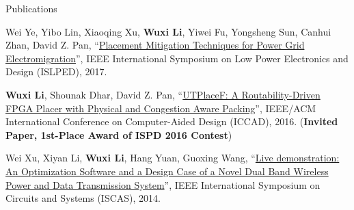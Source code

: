 \begin{rSection}{Publications}
\begin{description}[font=\normalfont]
\item[{[C3]}]{
    Wei Ye, Yibo Lin, Xiaoqing Xu, \textbf{Wuxi Li}, Yiwei Fu, Yongsheng Sun, Canhui Zhan, David Z. Pan,
    ``\href{http://ieeexplore.ieee.org/document/8009178/}{Placement Mitigation Techniques for Power Grid Electromigration}'',
    IEEE International Symposium on Low Power Electronics and Design (ISLPED), 2017.
}

\item[{[C2]}]{
    \textbf{Wuxi Li}, Shounak Dhar, David Z. Pan,
    ``\href{http://ieeexplore.ieee.org/document/7827643/}{UTPlaceF: A Routability-Driven FPGA Placer with Physical and Congestion Aware Packing}'',
    IEEE/ACM International Conference on Computer-Aided Design (ICCAD), 2016.
    (\textbf{Invited Paper, 1st-Place Award of ISPD 2016 Contest})
}

\item[{[C1]}]{
    Wei Xu, Xiyan Li, \textbf{Wuxi Li}, Hang Yuan, Guoxing Wang,
    ``\href{http://ieeexplore.ieee.org/document/6865159/}{Live demonstration: An Optimization Software and a Design Case of a Novel Dual Band Wireless Power and Data Transmission System}'',
    IEEE International Symposium on Circuits and Systems (ISCAS), 2014.
}

\end{description}

\end{rSection}
